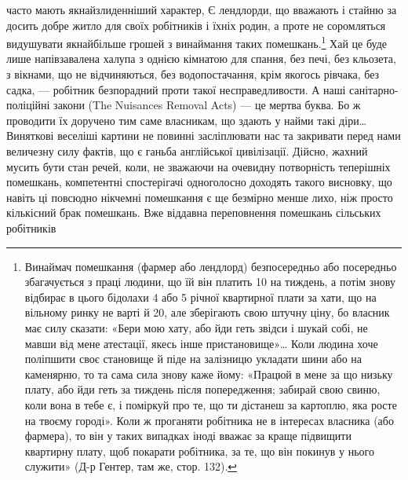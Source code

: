 часто мають якнайзлиденніший характер, Є лендлорди, що вважають
і стайню за досить добре житло для своїх робітників
і їхніх родин, а проте не соромляться видушувати якнайбільше
грошей з винаймання таких помешкань.\footnote{
Винаймач помешкання (фармер або лендлорд) безпосередньо або
посередньо збагачується з праці людини, що їй він платить 10
на тиждень, а потім знову відбирає в цього бідолахи 4 або 5 річної квартирної плати за хати, що на вільному ринку не
варті й 20, але зберігають свою штучну ціну, бо власник
має силу сказати: «Бери мою хату, або йди геть звідси і шукай собі,
не мавши від мене атестації, якесь інше пристановище»\dots{} Коли людина
хоче поліпшити своє становище й піде на залізницю укладати шини або
на каменярню, то та сама сила знову каже йому: «Працюй в мене за що
низьку плату, або йди геть за тиждень після попередження; забирай свою
свиню, коли вона в тебе є, і поміркуй про те, що ти дістанеш за картоплю,
яка росте на твоєму городі». Коли ж проганяти робітника не в інтересах
власника (або фармера), то він у таких випадках іноді вважає за краще
підвищити квартирну плату, щоб покарати робітника, за те, що він
покинув у нього служити» (Д-р Гентер, там же, стор. 132).
} Хай це буде лише
напівзавалена халупа з однією кімнатою для спання, без печі,
без кльозета, з вікнами, що не відчиняються, без водопостачання,
крім якогось рівчака, без садка, — робітник безпорадний проти
такої несправедливости. А наші санітарно-поліційні закони
(The Nuisances Removal Acts) — це мертва буква. Бо ж проводити
їх доручено тим саме власникам, що здають у найми
такі діри\dots{} Виняткові веселіші картини не повинні засліплювати
нас та закривати перед нами величезну силу фактів, що є ганьба
англійської цивілізації. Дійсно, жахний мусить бути стан речей,
коли, не зважаючи на очевидну потворність теперішніх
помешкань, компетентні спостерігачі одноголосно доходять такого
висновку, що навіть ці повсюдно нікчемні помешкання є ще
безмірно менше лихо, ніж просто кількісний брак помешкань.
Вже віддавна переповнення помешкань сільських робітників
\parbreak{}  %
